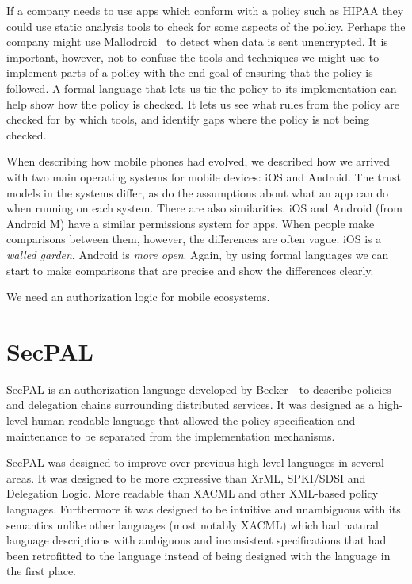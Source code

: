 \documentclass[thesis.tex]{subfiles}
\begin{document}
If a company needs to use apps which conform with a policy such as
\ac{HIPAA} they could use static analysis tools to check for some
aspects of the policy.  Perhaps the company might use
Mallodroid~\cite{fahl_why_2012} to detect when data is sent
unencrypted.  It is important, however, not to confuse the tools and
techniques we might use to implement parts of a policy with the end
goal of ensuring that the policy is followed.  A formal language that
lets us tie the policy to its implementation can help show how the
policy is checked.  It lets us see what rules from the policy are
checked for by which tools, and identify gaps where the policy is not
being checked.

When describing how mobile phones had evolved, we described how we
arrived with two main operating systems for mobile devices: iOS and
Android.  The trust models in the systems differ, as do the
assumptions about what an app can do when running on each system.
There are also similarities.  iOS and Android (from Android M) have a
similar permissions system for apps.  When people make comparisons
between them, however, the differences are often vague.  iOS is a
\emph{walled garden}.  Android is \emph{more open}.  Again, by using
formal languages we can start to make comparisons that are precise and
show the differences clearly.

We need an authorization logic for mobile ecosystems.

\section{SecPAL}


SecPAL is an authorization language developed by Becker~\etal~to
describe policies and delegation chains surrounding distributed
services.  It was designed as a high-level human-readable language
that allowed the policy specification and maintenance to be separated
from the implementation mechanisms.

SecPAL was designed to improve over previous high-level languages in
several areas.  It was designed to be more expressive than XrML,
SPKI/SDSI and Delegation Logic. More readable than XACML and other
XML-based policy languages.  Furthermore it was designed to be
intuitive and unambiguous with its semantics unlike other languages
(most notably XACML) which had natural language descriptions with
ambiguous and inconsistent specifications that had been retrofitted to
the language instead of being designed with the language in the first
place.
\end{document}
